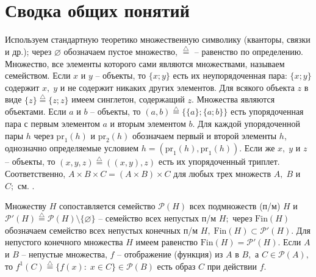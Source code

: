 \documentclass[10pt]{SPIIRAS_Proceedings}
\begin{document}
\section{Сводка общих понятий}
\label{sec:1}

Используем стандартную теоретико множественную символику
(кванторы, связки и др.);
через $\varnothing$ обозначаем пустое множество,
$\stackrel{\triangle}{=}$ -- равенство по определению.
Множество, все элементы которого сами являются множествами,
называем семейством.
Если $x$ и $y$ -- объекты,
то $\{x;y\}$
есть их неупорядоченная пара:
$\{x;y\}$ содержит $x,\;y$
и не содержит никаких других элементов.
Для всякого объекта $z$ в виде $\{z\} \stackrel{\triangle}{=} \{z;z\}$
имеем синглетон,
содержащий $z$.
Множества являются объектами.
Если $a$ и $b$ -- объекты, то
\cite[c.~67]{15}
$(a,b) \stackrel{\triangle}{=} \{\{a\};\{a;b\}\}$
есть упорядоченная пара с первым элементом $a$ и вторым элементом $b$.
Для каждой упорядоченной пары $h$ через
$\mathrm{pr}_1(h)$ и $\mathrm{pr}_2(h)$
обозначаем первый и второй элементы $h$,
однозначно определяемые условием
$h = (\mathrm{pr} _1(h),\mathrm{pr} _1(h))$.
Если же $x,\;y$ и $z$ -- объекты,
то $(x,y,z) \stackrel{\triangle}{=} ((x,y),z)$
есть их упорядоченный триплет.
Соответственно,
$A \times B \times C = (A \times B) \times C$
для любых трех множеств $A,\;B$ и $C;$ см.
\cite[c.17]{16}.

Множеству $H$
сопоставляется семейство $\mathcal{P}(H)$
всех подмножеств (п/м) $H$
и $\mathcal{P}'(H) \stackrel{\triangle}{=}
\mathcal{P}(H) \setminus \{\varnothing\}$ -- семейство всех непустых п/м $H;$
через $\mathrm{Fin}(H)$
обозначаем семейство всех непустых конечных п/м
$H,\;\mathrm{Fin}(H) \subset \mathcal{P}'(H).$
Для непустого конечного множества $H$ имеем равенство
$\mathrm{Fin}(H) = \mathcal{P}'(H).$
Если $A$ и $B$ -- непустые множества,
$f$ -- отображение (функция) из $A$ в $B,$
а $C \in \mathcal{P}(A),$ то
$f^1(C) \stackrel{\triangle}{=} \{f(x):\;x \in C\} \in \mathcal{P}(B)$
есть образ $C$ при действии $f.$
\end{document}
